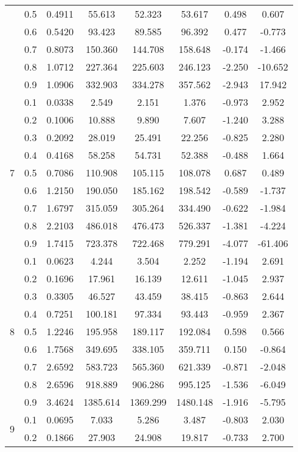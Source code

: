\documentclass[11pt,a4paper]{report}
\begin{document}
\begin{longtable}{ | c | c || c | c | c | c | c | c | }
 & 0.5 & 0.4911 & 55.613 & 52.323 & 53.617 & 0.498 & 0.607 \\
 & 0.6 & 0.5420 & 93.423 & 89.585 & 96.392 & 0.477 & -0.773 \\
 & 0.7 & 0.8073 & 150.360 & 144.708 & 158.648 & -0.174 & -1.466 \\
 & 0.8 & 1.0712 & 227.364 & 225.603 & 246.123 & -2.250 & -10.652 \\
 & 0.9 & 1.0906 & 332.903 & 334.278 & 357.562 & -2.943 & 17.942 \\
 \hline
\multirow{9}{*}{7} & 0.1 & 0.0338 & 2.549 & 2.151 & 1.376 & -0.973 & 2.952 \\
 & 0.2 & 0.1006 & 10.888 & 9.890 & 7.607 & -1.240 & 3.288 \\
 & 0.3 & 0.2092 & 28.019 & 25.491 & 22.256 & -0.825 & 2.280 \\
 & 0.4 & 0.4168 & 58.258 & 54.731 & 52.388 & -0.488 & 1.664 \\
 & 0.5 & 0.7086 & 110.908 & 105.115 & 108.078 & 0.687 & 0.489 \\
 & 0.6 & 1.2150 & 190.050 & 185.162 & 198.542 & -0.589 & -1.737 \\
 & 0.7 & 1.6797 & 315.059 & 305.264 & 334.490 & -0.622 & -1.984 \\
 & 0.8 & 2.2103 & 486.018 & 476.473 & 526.337 & -1.381 & -4.224 \\
 & 0.9 & 1.7415 & 723.378 & 722.468 & 779.291 & -4.077 & -61.406 \\
 \hline
\multirow{9}{*}{8} & 0.1 & 0.0623 & 4.244 & 3.504 & 2.252 & -1.194 & 2.691 \\
 & 0.2 & 0.1696 & 17.961 & 16.139 & 12.611 & -1.045 & 2.937 \\
 & 0.3 & 0.3305 & 46.527 & 43.459 & 38.415 & -0.863 & 2.644 \\
 & 0.4 & 0.7251 & 100.181 & 97.334 & 93.443 & -0.959 & 2.367 \\
 & 0.5 & 1.2246 & 195.958 & 189.117 & 192.084 & 0.598 & 0.566 \\
 & 0.6 & 1.7568 & 349.695 & 338.105 & 359.711 & 0.150 & -0.864 \\
 & 0.7 & 2.6592 & 583.723 & 565.360 & 621.339 & -0.871 & -2.048 \\
 & 0.8 & 2.6596 & 918.889 & 906.286 & 995.125 & -1.536 & -6.049 \\
 & 0.9 & 3.4624 & 1385.614 & 1369.299 & 1480.148 & -1.916 & -5.795 \\
 \hline
\multirow{9}{*}{9} & 0.1 & 0.0695 & 7.033 & 5.286 & 3.487 & -0.803 & 2.030 \\
 & 0.2 & 0.1866 & 27.903 & 24.908 & 19.817 & -0.733 & 2.700 \\

\end{longtable}
\end{document}
